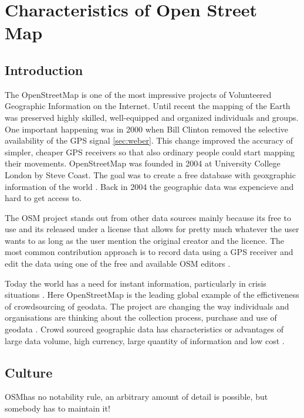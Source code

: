 \chapter{Characteristics of Open Street Map}
	
\section{Introduction}
The OpenStreetMap is one of the most impressive projects of Volunteered Geographic Information on the Internet\cite{Neis2012}. Until recent the mapping of the Earth was preserved highly skilled, well-equipped and organized individuals and groups. One important happening was in 2000 when Bill Clinton removed the selective availability of the GPS signal \ref{sec:weber}. This change improved the accuracy of simpler, cheaper GPS receivers so that also ordinary people could start mapping their movements. OpenStreetMap was founded in 2004 at University College London by Steve Coast. The goal was to create a free database with geoxgraphic information of the world \cite{Neis2012}. Back in 2004 the geographic data was expencieve and hard to get access to. 

The OSM project stands out from other data sources mainly because its free to use and its released under a license that allows for pretty much whatever the user wants to as long as the user mention the original creator and the licence\cite{Chilton}.  The most common contribution approach is to record data using a GPS receiver and edit the data using one of the free and available OSM editors \cite{Neis2012}.  

Today the world has a need for instant information, particularly in crisis situations \cite{Chilton}. Here OpenStreetMap is the leading global example of the effictiveness of crowdsourcing of geodata. The project are changing the way individuals and organisations are thinking about the collection process, purchase and use of geodata \cite{Chilton}.  Crowd sourced geographic data has characteristics or advantages of large data volume, high currency, large quantity of information and low cost \cite{Wang2013}.  

\section{Culture}
OSMhas no notability rule, an arbitrary amount of detail is possible, but somebody has to maintain it! %

